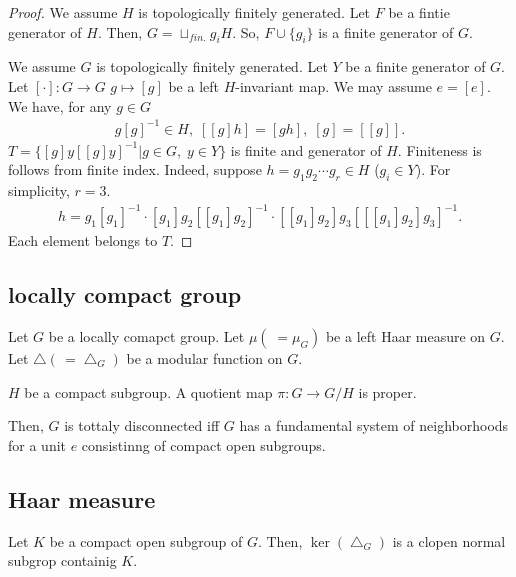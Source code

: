 \begin{proof}
  We assume $H$ is topologically finitely generated.
  Let $F$ be a fintie generator of $H$.
  Then, $G = \sqcup_{fin.} g_i H$.
  So, $F \cup \{g_i\}$ is a finite generator of $G$.


  We assume $G$ is topologically finitely generated.
  Let $Y$ be a finite generator of $G$.
  Let $[\cdot] : G \rightarrow G$ $g \mapsto [g]$ be a left $H$-invariant map.
  We may assume $e = [e]$.
  We have, for any $g \in G$
  \begin{align*}
    g[g]^{-1} \in H, \; [[g]h] = [gh], \; [g] = [[g]].
  \end{align*}
  $T = \{[g]y[[g]y]^{-1} | g \in G,\; y \in Y\}$ is finite and generator of $H$.
  Finiteness is follows from finite index.
  Indeed, suppose $h = g_1 g_2 \cdots g_r \in H$ ($g_i \in Y$).
  For simplicity, $r = 3$.
  \begin{align*}
    h = g_1 [g_1]^{-1} \cdot [g_1] g_2 [[g_1] g_2]^{-1} \cdot [[g_1] g_2] g_3 [[[g_1] g_2] g_3]^{-1}. 
  \end{align*}
  Each element belongs to $T$. 
\end{proof}

\subsection{locally compact group}

Let $G$ be a locally comapct group.
Let $\mu (\; =\mu_G)$ be a left Haar measure on $G$. 
Let $\bigtriangleup (\, = \bigtriangleup_G)$ be a modular function on $G$.  

\begin{corollary}
  $H$ be a compact subgroup.
  A quotient map $\pi : G \rightarrow G/H$ is proper.
\end{corollary}

\begin{proposition}
  Then, $G$ is tottaly disconnected iff $G$ has a fundamental system of neighborhoods for a unit $e$ consistinng of compact open subgroups.
\end{proposition}

\subsection{Haar measure}

\begin{proposition}
  Let $K$ be a compact open subgroup of $G$.
  Then, $\ker(\bigtriangleup_G)$ is a clopen normal subgrop containig $K$. 
\end{proposition}

